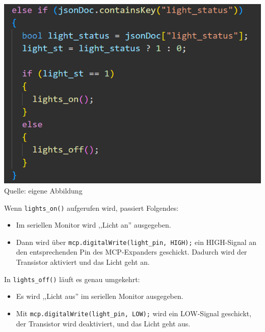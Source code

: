 \documentclass[ngerman,12pt,a4paper]{article}
\begin{document}
		\begin{center}
			\begin{minipage}{0.8\textwidth}
				\centering
				\includegraphics[width=\textwidth]{Pictures/code_licht_json}
				\label{fig:code_licht_json}
				\vspace{-3pt}
				{\small Quelle: {eigene Abbildung}}
				\vspace{0.5cm}
			\end{minipage}
		\end{center}
		
		Wenn \texttt{lights\_on()} aufgerufen wird, passiert Folgendes:
		\begin{itemize}
			\item Im seriellen Monitor wird ,,Licht an'' ausgegeben.
			\item Dann wird über \texttt{mcp.digitalWrite(light\_pin, HIGH);} ein HIGH-Signal an den entsprechenden Pin des MCP-Expanders geschickt. Dadurch wird der Transistor aktiviert und das Licht geht an.
		\end{itemize}
		
		In \texttt{lights\_off()} läuft es genau umgekehrt:
		
		\begin{itemize}
			\item Es wird ,,Licht aus'' im seriellen Monitor ausgegeben.
			\item Mit \texttt{mcp.digitalWrite(light\_pin, LOW);} wird ein LOW-Signal geschickt, der Transistor wird deaktiviert, und das Licht geht aus.
		\end{itemize}
		
\end{document}
